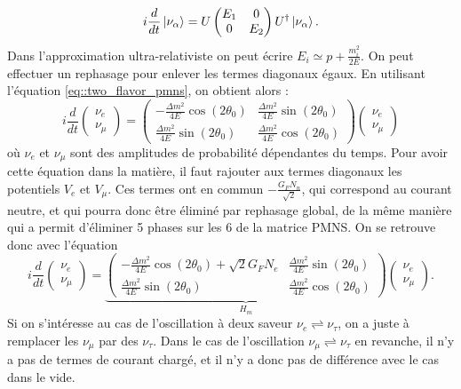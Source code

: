             \begin{equation}\label{eq::evolution_matter_2flavor}
                i\frac{d}{dt}\ket{\nu_{\alpha}} = U\left(\begin{matrix}E_1 & 0 \\ 0 & E_2\end{matrix}\right)U^{\dagger}\ket{\nu_{\alpha}}.
            \end{equation}
            Dans l'approximation ultra-relativiste on peut écrire $E_i \simeq p+ \frac{m_i^2}{2E}$. On peut effectuer un rephasage pour enlever les termes diagonaux égaux. En utilisant l'équation \eqref{eq::two_flavor_pmns}, on obtient alors :
            \begin{equation}
                i\frac{d}{dt}\left(\begin{matrix}\nu_e \\ \nu_{\mu}\end{matrix}\right) = \left(\begin{matrix}-\frac{\Delta m^2}{4E}\cos(2\theta_0) & \frac{\Delta m^2}{4E}\sin(2\theta_0) \\ \frac{\Delta m^2}{4E}\sin(2\theta_0) & \frac{\Delta m^2}{4E}\cos(2\theta_0)\end{matrix}\right)\left(\begin{matrix}\nu_e \\ \nu_{\mu}\end{matrix}\right)
            \end{equation}
            où $\nu_e$ et $\nu_{\mu}$ sont des amplitudes de probabilité dépendantes du temps. Pour avoir cette équation dans la matière, il faut rajouter aux termes diagonaux les potentiels $V_e$ et $V_{\mu}$. Ces termes ont en commun $-\frac{G_F N_n}{\sqrt{2}}$, qui correspond au courant neutre, et qui pourra donc être éliminé par rephasage global, de la même manière qui a permit d'éliminer 5 phases sur les 6 de la matrice PMNS. On se retrouve donc avec l'équation
            \begin{equation}\label{eq::hamiltonian_matter_2flavor}
                i\frac{d}{dt}\left(\begin{matrix}\nu_e \\ \nu_{\mu}\end{matrix}\right) = \underbrace{\left(\begin{matrix}-\frac{\Delta m^2}{4E}\cos(2\theta_0)+\sqrt{2}G_F N_e & \frac{\Delta m^2}{4E}\sin(2\theta_0) \\ \frac{\Delta m^2}{4E}\sin(2\theta_0) & \frac{\Delta m^2}{4E}\cos(2\theta_0)\end{matrix}\right)}_{H_m}\left(\begin{matrix}\nu_e \\ \nu_{\mu}\end{matrix}\right).
            \end{equation}
            Si on s'intéresse au cas de l'oscillation à deux saveur $\nu_e\rightleftharpoons\nu_{\tau}$, on a juste à remplacer les $\nu_{\mu}$ par des $\nu_{\tau}$. Dans le cas de l'oscillation $\nu_{\mu}\rightleftharpoons\nu_{\tau}$ en revanche, il n'y a pas de termes de courant chargé, et il n'y a donc pas de différence avec le cas dans le vide.
            
